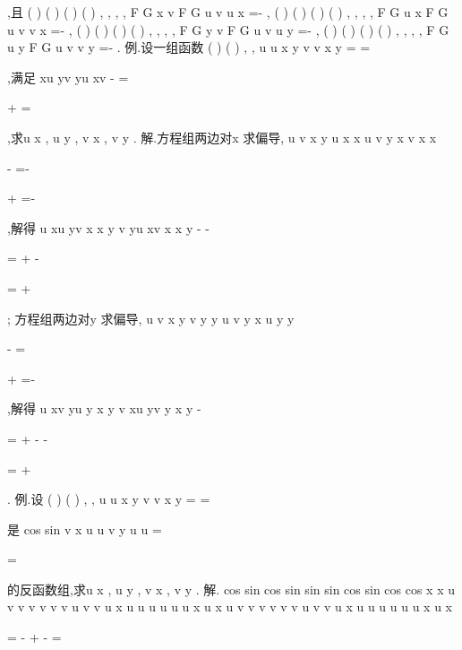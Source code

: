 ,且 
(
)
(
)
(
)
(
)
,
,
,
,
F G
x v
F G
u v
u
x
\partial 
\partial 
\partial 
\partial 
\partial 
=-
\partial 
,
(
)
(
)
(
)
(
)
,
,
,
,
F G
u x
F G
u v
v
x
\partial 
\partial 
\partial 
\partial 
\partial =-
\partial 
,
(
)
(
)
(
)
(
)
,
,
,
,
F G
y v
F G
u v
u
y
\partial 
\partial 
\partial 
\partial 
\partial 
=-
\partial 
,
(
)
(
)
(
)
(
)
,
,
,
,
F G
u y
F G
u v
v
y
\partial 
\partial 
\partial 
\partial 
\partial =-
\partial 
. 
\textcolor{lyred}{例}.设一组函数
(
)
(
)
,
,
u
u x y
v
v x y
=
=

,满足
xu
yv
yu
xv
-
=


+
=

,求u
x
\partial 
\partial , u
y
\partial 
\partial , v
x
\partial 
\partial , v
y
\partial 
\partial . 
解.方程组两边对x 求偏导,
u
v
x
y
u
x
x
u
v
y
x
v
x
x
\partial 
\partial 

-
=-
\partial 
\partial 
\partial 
\partial 

+
=-

\partial 
\partial 

,解得
u
xu
yv
x
x
y
v
yu
xv
x
x
y
\partial 
-
-

=
\partial 
+
\partial 
-

=
\partial 
+

; 
方程组两边对y 求偏导,
u
v
x
y
v
y
y
u
v
y
x
u
y
y
\partial 
\partial 

-
=
\partial 
\partial 
\partial 
\partial 

+
=-

\partial 
\partial 

,解得
u
xv
yu
y
x
y
v
xu
yv
y
x
y
\partial 
-

=
\partial 
+
\partial 
-
-

=
\partial 
+

. 
\textcolor{lyred}{例}.设
(
)
(
)
,
,
u
u x y
v
v x y
=
=

是
cos
sin
v
x
u
u
v
y
u
u
=


=

的反函数组,求u
x
\partial 
\partial , u
y
\partial 
\partial , v
x
\partial 
\partial , v
y
\partial 
\partial . 
解.
cos
sin
cos
sin
sin
sin
cos
sin
cos
cos
x
x
u
v
v
v
v
v
v
u
v
v
u
x
u
u
u
u
u
u
x
u
x
u
v
v
v
v
v
v
u
v
v
u
x
u
u
u
u
u
u
x
u
x

\partial 

\partial 
\partial 




=
-
\cdots 
+
-
\cdots 
=






